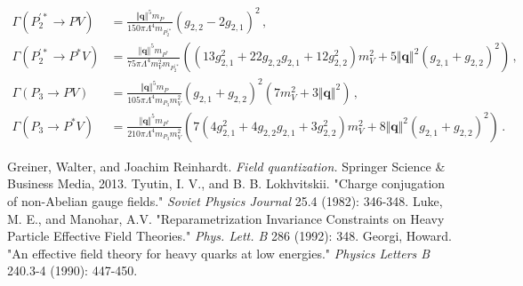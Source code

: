 \documentclass{article}
\begin{document}
\begin{align}
  \Gamma\left( P^{\prime *}_2 \to P V \right) &= \frac{\Vert\mathbf{q}\Vert^5 m_P}{150 \pi \Lambda^4 m_{P^{\prime *}_2}} \left(g_{2,2}-2 g_{2,1}\right)^2 \, , \\
  \Gamma\left( P^{\prime *}_2 \to P^* V \right) &= \frac{\Vert\mathbf{q}\Vert^5 m_{P^*}}{75 \pi \Lambda^4 m_V^2 m_{P^{\prime *}_2}} \left(\left(13 g_{2,1}^2+22 g_{2,2} g_{2,1}+12 g_{2,2}^2\right) m_V^2+5 \Vert\mathbf{q}\Vert^2 \left(g_{2,1}+g_{2,2}\right)^2\right)\, , \\
  \Gamma\left( P_3 \to P V \right) &= \frac{\Vert\mathbf{q}\Vert^5 m_P }{105 \pi \Lambda ^4 m_{P_3} m_V^2} \left(g_{2,1}+g_{2,2}\right)^2 \left(7 m_V^2+3 \Vert\mathbf{q}\Vert^2\right)\, , \\
  \Gamma\left( P_3 \to P^* V \right) &=  \frac{\Vert\mathbf{q}\Vert^5 m_{P^*}}{210 \pi  \Lambda ^4 m_{P_3} m_V^2} \left(7 \left(4 g_{2,1}^2+4 g_{2,2} g_{2,1}+3 g_{2,2}^2\right) m_V^2+8 \Vert\mathbf{q}\Vert^2 \left(g_{2,1}+g_{2,2}\right)^2\right)\, . 
\end{align}

\begin{thebibliography}{}
  Greiner, Walter, and Joachim Reinhardt. \textit{Field quantization.} Springer Science \& Business Media, 2013.
  Tyutin, I. V., and B. B. Lokhvitskii. "Charge conjugation of non-Abelian gauge fields." \textit{Soviet Physics Journal} 25.4 (1982): 346-348.
  Luke, M. E., and Manohar, A.V. "Reparametrization Invariance Constraints on Heavy Particle Effective Field Theories." \textit{Phys. Lett. B} 286 (1992): 348.
  Georgi, Howard. "An effective field theory for heavy quarks at low energies." \textit{Physics Letters B} 240.3-4 (1990): 447-450.
\end{thebibliography}
\end{document}
